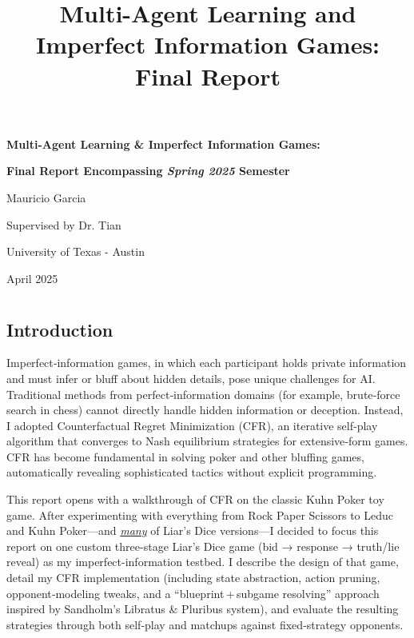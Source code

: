\documentclass[
]{article}
\title{Multi-Agent Learning and Imperfect Information Games: Final
Report}
\author{}
\date{}
\begin{document}
\maketitle

\textbf{Multi-Agent Learning \& Imperfect Information Games:}

\textbf{Final Report Encompassing \emph{Spring 2025} Semester}

Mauricio Garcia

Supervised by Dr. Tian

University of Texas - Austin

April 2025

\section{}\label{section}

\subsection{}\label{section-1}

\subsection{\texorpdfstring{\textbf{Introduction}}{Introduction}}\label{introduction}

Imperfect‑information games, in which each participant holds private
information and must infer or bluff about hidden details, pose unique
challenges for AI. Traditional methods from perfect‑information domains
(for example, brute‑force search in chess) cannot directly handle hidden
information or deception. Instead, I adopted Counterfactual Regret
Minimization (CFR), an iterative self‑play algorithm that converges to
Nash equilibrium strategies for extensive‑form games. CFR has become
fundamental in solving poker and other bluffing games, automatically
revealing sophisticated tactics without explicit programming.

This report opens with a walkthrough of CFR on the classic Kuhn Poker
toy game. After experimenting with everything from Rock Paper Scissors
to Leduc and Kuhn Poker---and \emph{\ul{many}} of Liar's Dice
versions---I decided to focus this report on one custom three-stage
Liar's Dice game (bid → response → truth/lie reveal) as my
imperfect-information testbed. I describe the design of that game,
detail my CFR implementation (including state abstraction, action
pruning, opponent‑modeling tweaks, and a ``blueprint\,+\,subgame
resolving'' approach inspired by Sandholm's Libratus \& Pluribus
system), and evaluate the resulting strategies through both self‑play
and matchups against fixed‑strategy opponents.
\end{document}
